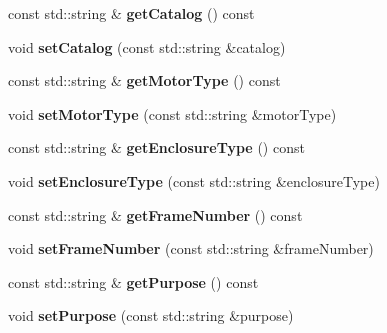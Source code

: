 \begin{DoxyCompactItemize}
\item 
\mbox{\label{class_motor_data_ad0bea8d8fa674403b5d8c2b23734e5e6}} 
const std\+::string \& {\bfseries get\+Catalog} () const
\item 
\mbox{\label{class_motor_data_ac7e264252a15a63a2fd35cbb114478e6}} 
void {\bfseries set\+Catalog} (const std\+::string \&catalog)
\item 
\mbox{\label{class_motor_data_a0f1b2a3eabac9ec961461132329062e7}} 
const std\+::string \& {\bfseries get\+Motor\+Type} () const
\item 
\mbox{\label{class_motor_data_a3b3f78a7e8e45a94df538d7663d56256}} 
void {\bfseries set\+Motor\+Type} (const std\+::string \&motor\+Type)
\item 
\mbox{\label{class_motor_data_ae63075e0e1b2ee0e7e0ffee9f5b55890}} 
const std\+::string \& {\bfseries get\+Enclosure\+Type} () const
\item 
\mbox{\label{class_motor_data_a7a6a1b8600a9c7481b32bf962edcef99}} 
void {\bfseries set\+Enclosure\+Type} (const std\+::string \&enclosure\+Type)
\item 
\mbox{\label{class_motor_data_a0602f5ef86ac7a80ae7944caa7d081ec}} 
const std\+::string \& {\bfseries get\+Frame\+Number} () const
\item 
\mbox{\label{class_motor_data_afea21a449177b09087441c58f4b81a84}} 
void {\bfseries set\+Frame\+Number} (const std\+::string \&frame\+Number)
\item 
\mbox{\label{class_motor_data_adf12be187c34b9a21e68cdf79d522a25}} 
const std\+::string \& {\bfseries get\+Purpose} () const
\item 
\mbox{\label{class_motor_data_a1c1c332dc9d549a1a50a0e2d93ec413a}} 
void {\bfseries set\+Purpose} (const std\+::string \&purpose)
\item 
\mbox{\label{class_motor_data_ae1272ec4b33461ff52558ff9ed93bcfa}} 

\end{DoxyCompactItemize}
